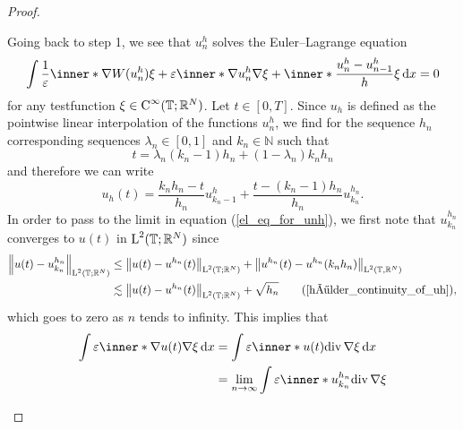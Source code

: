 \begin{proof}
\begin{description}[wide=0pt]
	Going back to step 1, we see that $ u_{ n }^{ h } $ solves the Euler--Lagrange equation
	\begin{equation}
		\label{el_eq_for_unh}
		\int
			\frac{ 1 }{ \varepsilon}
			\inner*{ \nabla W ( u_{ n }^{ h } ) }  { \xi }
			+
			\varepsilon
			\inner*{ \nabla u_{ n }^{ h } }{ \nabla \xi }
			+
			\inner*{ \frac{ u_{ n }^{ h } - u_{ n - 1 }^{ h } }{ h } }{ \xi }
		\dd{ x }
		=
		0
	\end{equation}
	for any testfunction $ \xi \in \operatorname{C}^{ \infty } ( \operatorname{\mathbb{T}} ; \mathbb{ R }^{ N } )  $.
	Let $ t \in [ 0 , T ] $. Since $ u_{ h } $ is defined as the pointwise linear interpolation of the functions $ u_{ n}^{ h } $, we find for the sequence $ h_{ n } $ corresponding sequences $ \lambda_{ n } \in [ 0 , 1 ] $ and $ k_{ n } \in \mathbb{ N }$ such that 
	\begin{equation*}
		t = \lambda_{ n } ( k_{ n } - 1 ) h_{ n } + ( 1 - \lambda_{ n } ) k_{ n } h_{ n } 
	\end{equation*}
	and therefore we can write
	\begin{equation*}
		u_{ h } ( t ) 
		=
		\frac{ k_{ n } h_{ n } - t }{ h_{ n } } u_{ k_{ n } - 1 }^{ h }
		+
		\frac{ t - ( k_{ n } - 1 ) h_{ n } }{ h_{ n } }
		u_{ k_{ n } }^{ h_{ n } }.
	\end{equation*}
	In order to pass to the limit in equation (\ref{el_eq_for_unh}), we first note that $ u_{ k_{ n } }^{ h_{ n } } $ converges to $ u ( t ) $ in $ \operatorname{L}^{ 2 } ( \operatorname{\mathbb{T}} ; \mathbb{ R }^{ N } ) $ since
	\begin{align*}
		\norm{ u ( t ) - u_{ k_{ n } }^{ h_{ n } } }_{ \lp^{ 2 } ( \flattorus ; \mathbb{ R }^{ N } ) }
		& \leq
		\norm{ u ( t ) - u^{ h_{ n } } ( t ) }_{ \lp^{ 2 } ( \flattorus ; \mathbb{ R }^{ N } ) }
		+
		\norm{ u^{ h_{ n } } ( t ) - u^{ h_{ n } } ( k_{n } h_{ n } ) }_{ \lp^{ 2 } ( \flattorus, \mathbb{ R }^{ N } ) }
		\\
		& \lesssim
		\norm{ u ( t ) - u^{ h_{ n } } ( t ) }_{ \lp^{ 2 } ( \flattorus ; \mathbb{ R }^{ N } ) }
		+ 
		\sqrt{ h_{ n } }
		\tag{\ref{hölder_continuity_of_uh}},
	\end{align*}
	which goes to zero as $ n $ tends to infinity.
	This implies that 
	\begin{align*}
		\int
			\varepsilon 
			\inner*{ \nabla u ( t ) }{ \nabla \xi }
		\dd{ x }
		& = 
		\int
			\varepsilon
			\inner*{ u ( t ) }{ \divg \nabla \xi  }
		\dd{ x }
		\\
		& = 
		\lim_{ n \to \infty }
			\int
				\varepsilon
				\inner*{ u_{ k_{ n } }^{ h_{ n } } }{ \divg \nabla \xi  }

\end{align*}
\end{description}
\end{proof}
